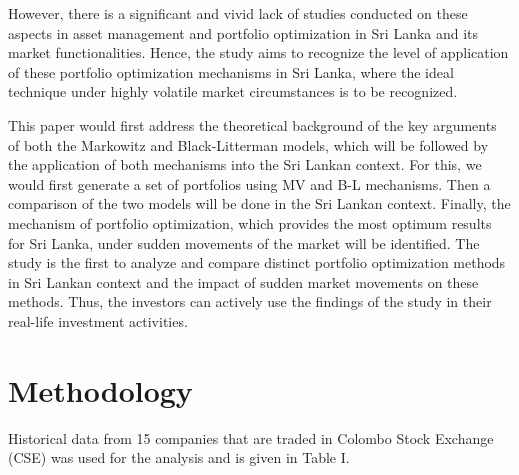 \documentclass[conference]{IEEEtran}
\begin{document}
However, there is a significant and vivid lack of studies conducted on these aspects in asset management and portfolio optimization in Sri Lanka and its market functionalities. Hence, the study aims to recognize the level of application of these portfolio optimization mechanisms in Sri Lanka, where the ideal technique under highly volatile market circumstances is to be recognized. 

This paper would first address the theoretical background of the key arguments of both the Markowitz and Black-Litterman models, which will be followed by the application of both mechanisms into the Sri Lankan context. For this, we would first generate a set of portfolios using MV and B-L mechanisms. Then a comparison of the two models will be done in the Sri Lankan context. Finally, the mechanism of portfolio optimization, which provides the most optimum results for Sri Lanka, under sudden  movements of the market will be identified. The study is the first to analyze and compare distinct portfolio optimization methods in Sri Lankan context and the impact of sudden market movements on these methods. Thus, the investors can actively use the findings of the study in their real-life investment activities. 

\section{Methodology}
Historical data from 15 companies that are traded in Colombo Stock Exchange (CSE) was used for the analysis and is given in Table I.
\end{document}
